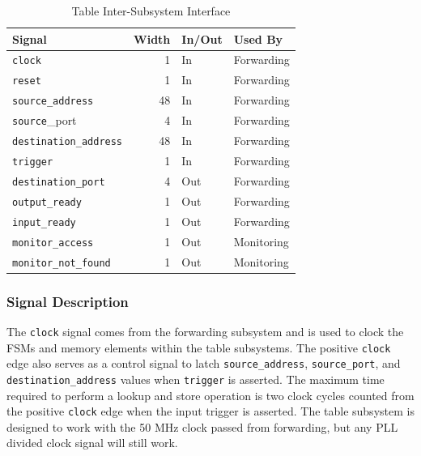 \documentclass{article}
\begin{document}
\begin{table}[ht]
    \begin{center}
        \begin{tabular}{lrll}\hline
        Signal & Width & In/Out & Used By \\
        \hline
        \texttt{clock} & 1 & In & Forwarding \\
        \hline
        \texttt{reset} & 1 & In & Forwarding \\
        \hline
        \texttt{source\_address} & 48 & In & Forwarding \\
        \hline
        \texttt{source}\_port & 4 & In & Forwarding \\
        \hline
        \texttt{destination\_address} & 48 & In & Forwarding \\
        \hline
        \texttt{trigger} & 1 & In & Forwarding \\
        \hline
        \texttt{destination\_port} & 4 & Out & Forwarding \\
        \hline
        \texttt{output\_ready} & 1 & Out & Forwarding \\
        \hline
        \texttt{input\_ready} & 1 & Out & Forwarding \\
        \hline
        \texttt{monitor\_access} & 1 & Out & Monitoring \\
        \hline
        \texttt{monitor\_not\_found} & 1 & Out & Monitoring \\
        \hline
        \end{tabular}
        \caption{Table Inter-Subsystem Interface}\label{tab:a}
    \end{center}
\end{table}

\subsubsection{Signal Description}

The \texttt{clock} signal comes from the forwarding subsystem and is used to clock the FSMs and memory elements within the table subsystems. The positive \texttt{clock} edge also serves as a control signal to latch \texttt{source\_address}, \texttt{source\_port}, and \texttt{destination\_address} values when \texttt{trigger} is asserted. The maximum time required to perform a lookup and store operation is two clock cycles counted from the positive \texttt{clock} edge when the input trigger is asserted. The table subsystem is designed to work with the 50 MHz clock passed from forwarding, but any PLL divided clock signal will still work. 
\end{document}
